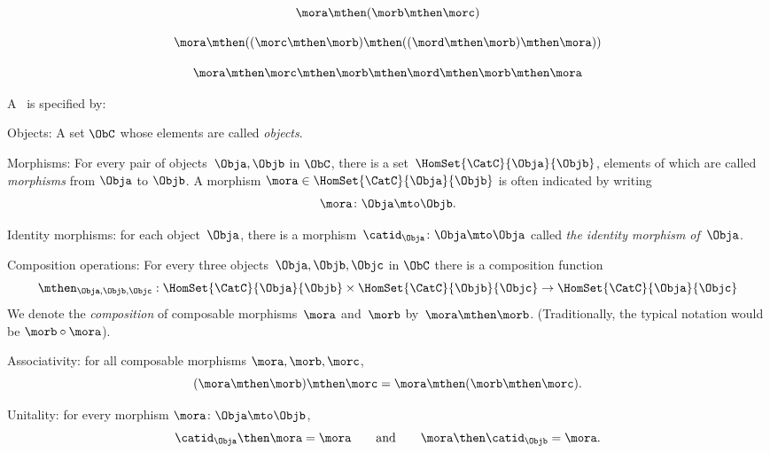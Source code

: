 {\begin{forslides}
  \begin{equation}\label{eq:12}
 \mora \mthen  (\morb \mthen \morc )
 \end{equation}
 
 \begin{equation}\label{eq:13}
 \mora \mthen  ((\morc \mthen \morb ) \mthen (( \mord \mthen \morb ) \mthen \mora ))
 \end{equation}
 
 \begin{equation}\label{eq:14}
 \mora \mthen  \morc \mthen \morb  \mthen \mord \mthen \morb  \mthen \mora
 \end{equation}

 
 \begin{ctdefinition}
  \label{def:category-var}
  A \emph{}~\CatC is specified by:
\begin{body}
    \constit
  \begin{compactenum}
    \item Objects: A set $\ObC$ whose elements are called \emph{objects}.
    \item Morphisms: For every pair of objects~$\Obja,\Objb$ in $\ObC$, there is a set~$\HomSet{\CatC}{\Obja}{\Objb}$, elements of which are called \emph{morphisms} from $\Obja$ to $\Objb$. A morphism $\mora \in \HomSet{\CatC}{\Obja}{\Objb}$ is often indicated by writing
    \begin{equation*}
    \mora \colon \Obja \mto \Objb.
    \end{equation*}
	\item Identity morphisms: for each object~$\Obja$, there is
    a morphism~$\catid_{\Obja}\colon \Obja \mto \Obja$  called \emph{the identity
    morphism of~$\Obja$}.
    \item Composition operations: For every three objects~$\Obja,\Objb,\Objc$ in $\ObC$ there is a composition function
    \begin{equation*}
        \mthen_{\Obja,\Objb,\Objc}: \HomSet{\CatC}{\Obja}{\Objb} \times \HomSet{\CatC}{\Objb}{\Objc}\to \HomSet{\CatC}{\Obja}{\Objc}
    \end{equation*}
    We denote the \emph{composition} of composable morphisms~$\mora$ and~$\morb$ by~$\mora \mthen \morb$. (Traditionally, the typical notation would be $\morb \circ \mora$).
      
  \end{compactenum}
 \condit
  \begin{compactenum}
    \item Associativity:  for all composable morphisms $\mora, \morb, \morc$, 
    $$ (\mora\mthen \morb)
      \mthen \morc= \mora \mthen (\morb \mthen \morc).$$
       \item Unitality: for every morphism $\mora \colon \Obja \mto \Objb$,
       $$ \catid_{\Obja} \then \mora = \mora \quad \quad \text{and} \quad \quad \mora \then \catid_{\Objb} = \mora. $$
  \end{compactenum}
  \end{body}
\end{ctdefinition}


\end{forslides}}

